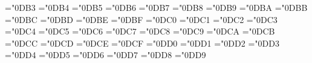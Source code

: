 \let\mNotSubset=\NotSubset 
\mathchardef\NotSuperset ="0DB3
\let\mNotSuperset=\NotSuperset 
\mathchardef\subseteq ="0DB4
\let\mSubsetEqual=\subseteq 
\mathchardef\supseteq ="0DB5
\let\mSupersetEqual=\supseteq 
\mathchardef\nsubseteq ="0DB6
\let\mNotSubsetEqual=\nsubseteq 
\mathchardef\nsupseteq ="0DB7
\let\mNotSupersetEqual=\nsupseteq 
\mathchardef\sqsubset ="0DB8
\let\mSquareSubset=\sqsubset 
\mathchardef\sqsupset ="0DB9
\let\mSquareSuperset=\sqsupset 
\mathchardef\sqsubseteq ="0DBA
\let\mSquareSubsetEqual=\sqsubseteq 
\mathchardef\sqsupseteq ="0DBB
\let\mSquareSupersetEqual=\sqsupseteq 
\mathchardef\NotSquareSubset ="0DBC
\let\mNotSquareSubset=\NotSquareSubset 
\mathchardef\NotSquareSuperset ="0DBD
\let\mNotSquareSuperset=\NotSquareSuperset 
\mathchardef\NotSquareSubsetEqual ="0DBE
\let\mNotSquareSubsetEqual=\NotSquareSubsetEqual 
\mathchardef\NotSquareSupersetEqual ="0DBF
\let\mNotSquareSupersetEqual=\NotSquareSupersetEqual 
\mathchardef\prec ="0DC0
\let\mPrecedes=\prec 
\mathchardef\succ ="0DC1
\let\mSucceeds=\succ 
\mathchardef\preceq ="0DC2
\let\mPrecedesEqual=\preceq 
\mathchardef\succeq ="0DC3
\let\mSucceedsEqual=\succeq 
\mathchardef\precsim ="0DC4
\let\mPrecedesTilde=\precsim 
\mathchardef\succsim ="0DC5
\let\mSucceedsTilde=\succsim 
\mathchardef\nprec ="0DC6
\let\mNotPrecedes=\nprec 
\mathchardef\nsucc ="0DC7
\let\mNotSucceeds=\nsucc 
\mathchardef\PrecedesSlantEqual ="0DC8
\let\mPrecedesSlantEqual=\PrecedesSlantEqual 
\mathchardef\NotPrecedesEqual ="0DC9
\let\mNotPrecedesEqual=\NotPrecedesEqual 
\mathchardef\NotPrecedesSlantEqual ="0DCA
\let\mNotPrecedesSlantEqual=\NotPrecedesSlantEqual 
\mathchardef\NotPrecedesTilde ="0DCB
\let\mNotPrecedesTilde=\NotPrecedesTilde 
\mathchardef\SucceedsSlantEqual ="0DCC
\let\mSucceedsSlantEqual=\SucceedsSlantEqual 
\mathchardef\NotSucceedsEqual ="0DCD
\let\mNotSucceedsEqual=\NotSucceedsEqual 
\mathchardef\NotSucceedsSlantEqual ="0DCE
\let\mNotSucceedsSlantEqual=\NotSucceedsSlantEqual 
\mathchardef\NotSucceedsTilde ="0DCF
\let\mNotSucceedsTilde=\NotSucceedsTilde 
\mathchardef\perp ="0DD0
\let\mUpTee=\perp 
\mathchardef\propto ="0DD1
\let\mProportional=\propto 
\mathchardef\Proportion ="0DD2
\let\mProportion=\Proportion 
\mathchardef\equiv ="0DD3
\let\mCongruent=\equiv 
\mathchardef\NotCongruent ="0DD4
\let\mNotCongruent=\NotCongruent 
\mathchardef\asymp ="0DD5
\let\mCupCap=\asymp 
\mathchardef\NotCupCap ="0DD6
\let\mNotCupCap=\NotCupCap 
\mathchardef\Equilibrium ="0DD7
\let\mEquilibrium=\Equilibrium 
\mathchardef\ReverseEquilibrium ="0DD8
\let\mReverseEquilibrium=\ReverseEquilibrium 
\mathchardef\UpEquilibrium ="0DD9

